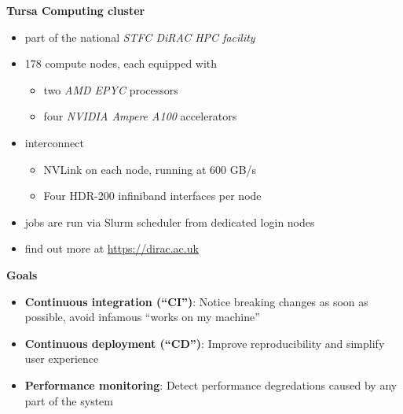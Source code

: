 \documentclass[english,xcolor=pst,11pt]{beamer}
\begin{document}
\begin{frame}
 \textbf{Tursa Computing cluster}
 \begin{itemize}
  \item part of the national \emph{STFC DiRAC HPC facility}
  \item 178 compute nodes, each equipped with
  \begin{itemize}
    \item two \emph{AMD EPYC} processors
    \item four \emph{NVIDIA Ampere A100} accelerators
  \end{itemize}
  \item interconnect
  \begin{itemize}
   \item NVLink on each node, running at 600 GB/s
   \item Four HDR-200 infiniband interfaces per node
  \end{itemize}

  \item jobs are run via Slurm scheduler from dedicated login nodes
  \item find out more at \url{https://dirac.ac.uk}

 \end{itemize}

\end{frame}

\begin{frame}

\textbf{Goals}
\begin{itemize}
 \item \textbf{Continuous integration (``CI'')}: Notice breaking changes as soon as possible, avoid infamous ``works on my machine''
 \item \textbf{Continuous deployment (``CD'')}: Improve reproducibility and simplify user experience
 \item \textbf{Performance monitoring}: Detect performance degredations caused by any part of the system
\end{itemize}

\end{frame}
\end{document}
